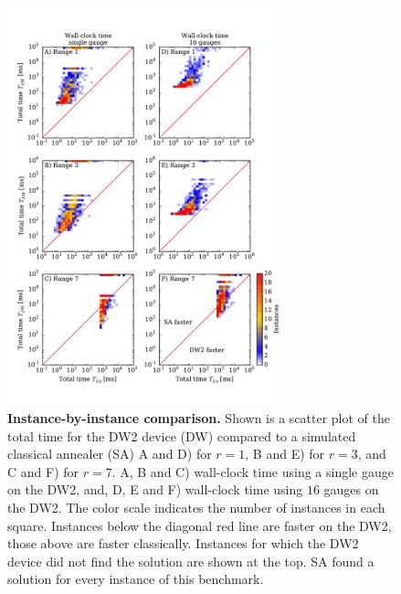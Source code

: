\begin{figure}
\centering
\includegraphics[width=0.7\textwidth]{chapters/Speedup/sfigures/sfig06_leftover.pdf}
\caption{{\bf Instance-by-instance comparison.} Shown is a scatter plot of the total time for the DW2 device (DW) compared to a simulated classical annealer (SA) A and D) for $r=1$, B and E) for $r=3$, and C and F) for $r=7$.
A, B and C) wall-clock time using a single gauge on the DW2, and, D, E and F)  wall-clock time using $16$ gauges on the DW2.  The color scale indicates the number of instances in each square. Instances below the diagonal red line are faster on the DW2, those above are faster classically.
Instances for which the DW2 device did not find the solution are shown at the top. SA found a solution for every instance of this benchmark.}
\label{fig:ratiosannealingSI}
\end{figure}



